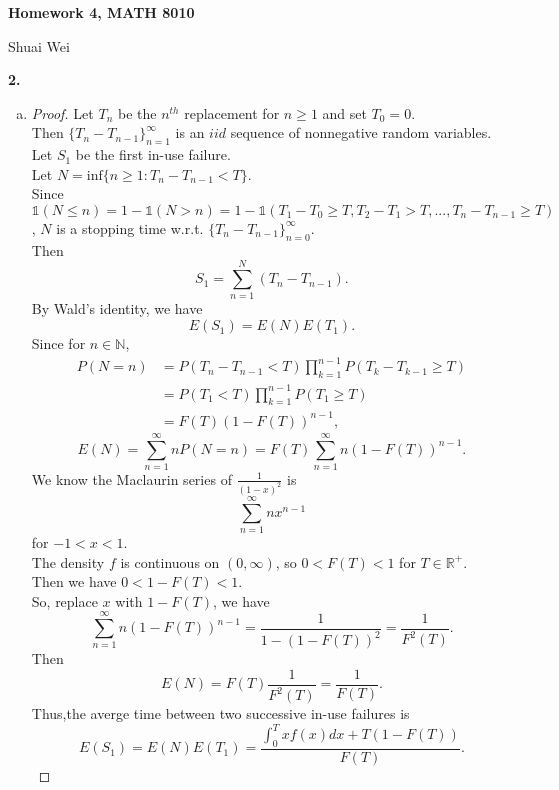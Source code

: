 \documentclass{extarticle}
\newcommand{\idca}{\mathbb{1}}
\newcommand{\bbr}{\mathbb{R}}
\newcommand{\bbn}{\mathbb{N}}
\theoremstyle{plain}
\theoremstyle{definition}
\begin{document}
\begin{center}
    \textbf{Homework 4, MATH 8010}

	Shuai Wei 
\end{center}

\noindent \textbf{2.} \\
\begin{enumerate}[(b)]
	\item
	\begin{proof}
	  Let $T_n$ be the $n^{th}$ replacement for $n \geq 1$ and set $T_{0} = 0$.\\
	  Then $\{T_n-T_{n-1}\}_{n=1}^{\infty}$ is an $iid$ sequence of nonnegative random variables.
		Let $S_1$ be the first in-use failure.\\
		Let $N = \text{inf}\{n \geq 1: T_{n}-T_{n-1} < T\}$.\\
	  	Since $\idca(N \leq n) = 1-\idca(N > n) = 1-\idca(T_{1}-T_{0} \geq T, T_{2}-T_{1}> T,...,T_{n}-T_{n-1} \geq T)$, $N$ is a stopping time w.r.t. $\{T_n-T_{n-1}\}_{n=0}^{\infty}$.\\
	  	Then 
	  	\[S_1 = \sum_{n=1}^{N}(T_n-T_{n-1}).\]
	  	By Wald's identity, we have 
	  	\[E(S_1) = E(N)E(T_1).\]
		Since for $n \in \bbn$, 
		\begin{align*}
		  P(N=n) &=P(T_n-T_{n-1} < T)\prod_{k=1}^{n-1}P(T_k-T_{k-1} \geq T) \\
				 	&=P(T_1 < T)\prod_{k=1}^{n-1}P(T_1 \geq T) \\
		  			&=F(T)\left(1-F(T)\right)^{n-1}, 
	  	\end{align*}
		\[E(N) = \sum_{n=1}^{\infty}nP(N=n) = F(T)\sum_{n=1}^{\infty}n\left(1-F(T)\right)^{n-1}. \]
		We know the Maclaurin series of $\frac{1}{(1-x)^2}$ is 
		\[ \sum_{n=1}^{\infty}nx^{n-1}\] 
		for $-1 < x < 1$.\\
	    The density $f$ is continuous on $(0,\infty)$, so $0 < F(T) < 1$ for $T \in \bbr^+$.\\
	    Then we have $0 < 1-F(T) < 1$.\\
	    So, replace $x$ with $1-F(T)$, we have 
	    \[ \sum_{n=1}^{\infty}n\left(1-F(T)\right)^{n-1} = \frac{1}{1-\left(1-F(T)\right)^2} = \frac{1}{F^2(T)}. \] 
		Then 
	    \[E(N) = F(T)\frac{1}{F^2(T)} = \frac{1}{F(T)}.\]
	    Thus,the averge time between two successive in-use failures is
	    \[E(S_1) = E(N)E(T_1) = \frac{\int_0^Txf(x)dx+T\left(1-F(T)\right)}{F(T)}.\]
	\end{proof}
 \end{enumerate}
\newpage
\end{document}
